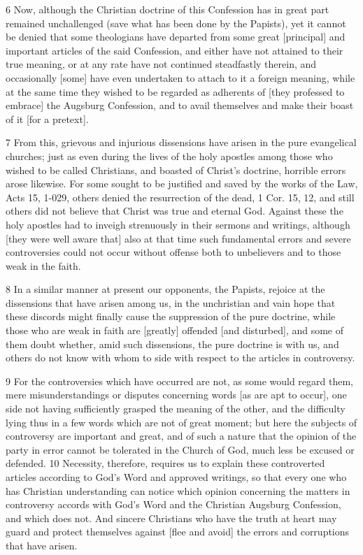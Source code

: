 6 Now, although the Christian doctrine of this Confession has in great part remained unchallenged (save what has been done by the Papists), yet it cannot be denied that some theologians have departed from some great [principal] and important articles of the said Confession, and either have not attained to their true meaning, or at any rate have not continued steadfastly therein, and occasionally [some] have even undertaken to attach to it a foreign meaning, while at the same time they wished to be regarded as adherents of [they professed to embrace] the Augsburg Confession, and to avail themselves and make their boast of it [for a pretext].

7 From this, grievous and injurious dissensions have arisen in the pure evangelical churches; just as even during the lives of the holy apostles among those who wished to be called Christians, and boasted of Christ’s doctrine, horrible errors arose likewise. For some sought to be justified and saved by the works of the Law, Acts 15, 1-029, others denied the resurrection of the dead, 1 Cor. 15, 12, and still others did not believe that Christ was true and eternal God. Against these the holy apostles had to inveigh strenuously in their sermons and writings, although [they were well aware that] also at that time such fundamental errors and severe controversies could not occur without offense both to unbelievers and to those weak in the faith.

8 In a similar manner at present our opponents, the Papists, rejoice at the dissensions that have arisen among us, in the unchristian and vain hope that these discords might finally cause the suppression of the pure doctrine, while those who are weak in faith are [greatly] offended [and disturbed], and some of them doubt whether, amid such dissensions, the pure doctrine is with us, and others do not know with whom to side with respect to the articles in controversy.

9 For the controversies which have occurred are not, as some would regard them, mere misunderstandings or disputes concerning words [as are apt to occur], one side not having sufficiently grasped the meaning of the other, and the difficulty lying thus in a few words which are not of great moment; but here the subjects of controversy are important and great, and of such a nature that the opinion of the party in error cannot be tolerated in the Church of God, much less be excused or defended.
10 Necessity, therefore, requires us to explain these controverted articles according to God’s Word and approved writings, so that every one who has Christian understanding can notice which opinion concerning the matters in controversy accords with God’s Word and the Christian Augsburg Confession, and which does not. And sincere Christians who have the truth at heart may guard and protect themselves against [flee and avoid] the errors and corruptions that have arisen.

